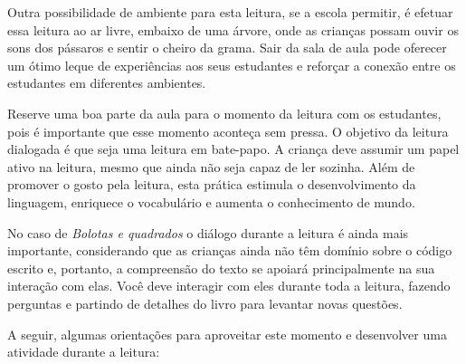 \documentclass[11pt]{extarticle}
\begin{document}
Outra possibilidade de ambiente para esta leitura, se a escola permitir, 
é efetuar essa leitura ao ar livre, embaixo de uma árvore, onde as crianças 
possam ouvir os sons dos pássaros e sentir o cheiro da grama. Sair da sala 
de aula pode oferecer um ótimo leque de experiências aos seus estudantes e 
reforçar a conexão entre os estudantes em diferentes ambientes.  

Reserve uma boa parte da aula para o momento da leitura com os estudantes, 
pois é importante que esse momento aconteça sem pressa. O objetivo da 
leitura dialogada é que seja uma leitura em bate-papo. A criança deve 
assumir um papel ativo na leitura, mesmo que ainda não seja capaz de 
ler sozinha. Além de promover o gosto pela leitura, esta prática estimula 
o desenvolvimento da linguagem, enriquece o vocabulário e 
aumenta o conhecimento de mundo.

No caso de \textit{Bolotas e quadrados} o diálogo durante a leitura é 
ainda mais importante, considerando que as crianças ainda não têm domínio sobre o código escrito e, portanto, a compreensão do texto se apoiará principalmente na sua interação com elas. 
Você deve interagir com eles durante toda a 
leitura, fazendo perguntas e partindo de detalhes do livro para 
levantar novas questões. 

A seguir, algumas orientações para aproveitar este momento e desenvolver uma atividade durante a leitura: 
\end{document}
